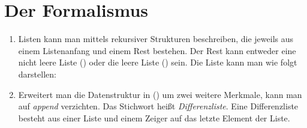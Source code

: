 \section{Der Formalismus}

\begin{enumerate}
\item Listen kann man mittels rekursiver Strukturen beschreiben, die jeweils aus einem Listenanfang
  und einem Rest bestehen. Der Rest kann entweder eine nicht leere Liste () oder die
  leere Liste () sein. Die Liste  kann man wie folgt darstellen:
\ea
{}
\z
\item Erweitert man die Datenstruktur in () um zwei weitere Merkmale, kann man auf
  \emph{append} verzichten. Das Stichwort heißt \emph{Differenzliste}. Eine Differenzliste besteht
  aus einer Liste und einem Zeiger auf das letzte Element der Liste. 
\ea
{}
\z


\end{enumerate}
